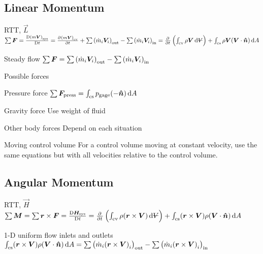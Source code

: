 \documentclass{article}
\begin{document}
\subsection{Linear Momentum}
\begin{description*}
\item[RTT, $\vec{L}$]
  \(\sum{\vec{F}}
  = \frac{\Dif{(m\vec{V})}_\mrm{sys}}{\Dif t}
  = \pd{{(m\vec{V})}_\mrm{cv}}{t}
  + \sum{\left(\dot{m}_i\vec{V}_i\right)}_\mrm{out}
  - \sum{\left(\dot{m}_i\vec{V}_i\right)}_\mrm{in}
  = \pd{}{t}\left(\int_\mrm{cv}\rho\vec{V}\dif{\volsym}\right)
  + \int_\mrm{cs}\rho\vec{V}(\vec{V}\cdot\uvec{n})\dif{A}\)
\item[Steady flow]
  \(\sum{\bm{F}}
  = \sum{\left(\dot{m}_i\bm{V}_i\right)}_{\mathrm{out}}
  - \sum{\left(\dot{m}_i\bm{V}_i\right)}_{\mathrm{in}}\)
\item[Possible forces]~
  \begin{description*}
    \item[Pressure force]
      \(\sum\vec{F}_\mrm{press} = \int_\mrm{cs}p_\mrm{gage}(-\uvec{n})\dif{A}\)
    \item[Gravity force] Use weight of fluid
    \item[Other body forces] Depend on each situation
  \end{description*}
\item[Moving control volume] For a control volume moving at constant velocity, use the same
  equations but with all velocities relative to the control volume.
\end{description*}

\subsection{Angular Momentum}
\begin{description*}
\item[RTT, $\vec{H}$]
  \(\sum\vec{M} = \sum\vec{r}\times\vec{F}
  = \frac{\Dif \vec{H}_\mrm{sys}}{\Dif t}
  = \pd{}{t}\left(\int_\mrm{cv}\rho(\vec{r}\times\vec{V})\dif{\volsym}\right)
  + \int_\mrm{cs}(\vec{r}\times\vec{V})\rho(\vec{V}\cdot\uvec{n})\dif{A}\)
\item[1-D uniform flow inlets and outlets]
  \(\int_\mrm{cs}(\vec{r}\times\vec{V})\rho(\vec{V}\cdot\uvec{n})\dif{A}
  = \sum{\left(\dot{m}_i{(\vec{r}\times\vec{V})}_i\right)}_\mrm{out}
  - \sum{\left(\dot{m}_i{(\vec{r}\times\vec{V})}_i\right)}_\mrm{in}\)
\end{description*}
\end{document}
